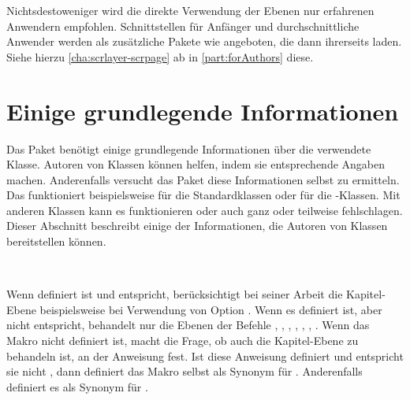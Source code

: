 Nichtsdestoweniger wird die direkte Verwendung der Ebenen nur erfahrenen
Anwendern empfohlen. Schnittstellen für Anfänger und durchschnittliche
Anwender werden als zusätzliche Pakete wie
\hyperref[cha:scrlayer-scrpage]{} angeboten, die
dann ihrerseits  laden. Siehe hierzu
\autoref{cha:scrlayer-scrpage} ab  in
\autoref{part:forAuthors} diese.




\section{Einige grundlegende Informationen}

Das Paket benötigt einige grundlegende Informationen über die
verwendete Klasse. Autoren von Klassen können  helfen, indem
sie entsprechende Angaben machen. Anderenfalls versucht das Paket diese
Informationen selbst zu ermitteln. Das funktioniert beispielsweise für die
Standardklassen oder für die \KOMAScript-Klassen. Mit anderen Klassen kann es
funktionieren oder auch ganz oder teilweise fehlschlagen.
\iffalse \par\fi%
Dieser Abschnitt beschreibt einige der Informationen, die Autoren von Klassen
bereitstellen können.\iffalse Anwender sollten sich im Normalfall nicht darum zu
kümmern brauchen.\fi

\begin{Declaration}
  \ \ %
  \ \ 
\end{Declaration}
Wenn  definiert ist und 
entspricht, berücksichtigt  bei seiner Arbeit die
Kapitel-Ebene beispielsweise bei Verwendung von Option
. Wenn es definiert ist, aber nicht
 entspricht, behandelt  nur die Ebenen der
Befehle , ,
, ,
, ,
. Wenn das Makro nicht definiert ist, macht
 die Frage, ob auch die Kapitel-Ebene zu behandeln ist, an
der Anweisung  fest. Ist diese Anweisung
definiert und entspricht sie nicht , dann definiert
 das Makro  selbst als Synonym für
. Anderenfalls definiert es  als Synonym für
.%
%
\EndIndexGroup


